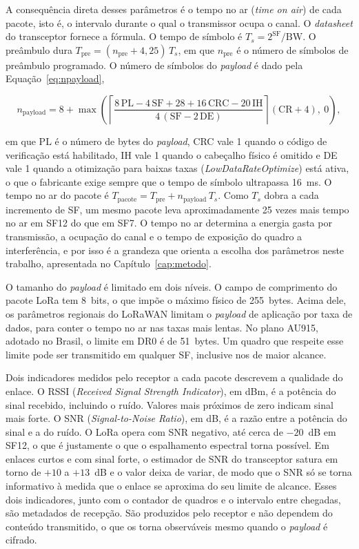 A consequência direta desses parâmetros é o tempo no ar (\textit{time on air}) de cada pacote, isto é, o intervalo durante o qual o transmissor ocupa o canal. O \textit{datasheet} do transceptor \cite{semtech2015sx1276} fornece a fórmula. O tempo de símbolo é $T_s = 2^{\mathrm{SF}}/\mathrm{BW}$. O preâmbulo dura $T_{\mathrm{pre}} = (n_{\mathrm{pre}} + 4{,}25)\,T_s$, em que $n_{\mathrm{pre}}$ é o número de símbolos de preâmbulo programado. O número de símbolos do \textit{payload} é dado pela Equação~\ref{eq:npayload},

\begin{equation}
\label{eq:npayload}
n_{\mathrm{payload}} = 8 + \max\!\left( \left\lceil \frac{8\,\mathrm{PL} - 4\,\mathrm{SF} + 28 + 16\,\mathrm{CRC} - 20\,\mathrm{IH}}{4\,(\mathrm{SF} - 2\,\mathrm{DE})} \right\rceil (\mathrm{CR} + 4),\ 0 \right),
\end{equation}

\noindent em que PL é o número de bytes do \textit{payload}, CRC vale 1 quando o código de verificação está habilitado, IH vale 1 quando o cabeçalho físico é omitido e DE vale 1 quando a otimização para baixas taxas (\textit{LowDataRateOptimize}) está ativa, o que o fabricante exige sempre que o tempo de símbolo ultrapassa 16~ms. O tempo no ar do pacote é $T_{\mathrm{pacote}} = T_{\mathrm{pre}} + n_{\mathrm{payload}}\,T_s$. Como $T_s$ dobra a cada incremento de SF, um mesmo pacote leva aproximadamente 25 vezes mais tempo no ar em SF12 do que em SF7. O tempo no ar determina a energia gasta por transmissão, a ocupação do canal e o tempo de exposição do quadro a interferência, e por isso é a grandeza que orienta a escolha dos parâmetros neste trabalho, apresentada no Capítulo~\ref{cap:metodo}.

O tamanho do \textit{payload} é limitado em dois níveis. O campo de comprimento do pacote LoRa tem 8~bits, o que impõe o máximo físico de 255~bytes. Acima dele, os parâmetros regionais do LoRaWAN \cite{lorawan_rp002} limitam o \textit{payload} de aplicação por taxa de dados, para conter o tempo no ar nas taxas mais lentas. No plano AU915, adotado no Brasil, o limite em DR0 é de 51~bytes. Um quadro que respeite esse limite pode ser transmitido em qualquer SF, inclusive nos de maior alcance.

Dois indicadores medidos pelo receptor a cada pacote descrevem a qualidade do enlace. O RSSI (\textit{Received Signal Strength Indicator}), em dBm, é a potência do sinal recebido, incluindo o ruído. Valores mais próximos de zero indicam sinal mais forte. O SNR (\textit{Signal-to-Noise Ratio}), em dB, é a razão entre a potência do sinal e a do ruído. O LoRa opera com SNR negativo, até cerca de $-20$~dB em SF12, o que é justamente o que o espalhamento espectral torna possível. Em enlaces curtos e com sinal forte, o estimador de SNR do transceptor satura em torno de $+10$ a $+13$~dB e o valor deixa de variar, de modo que o SNR só se torna informativo à medida que o enlace se aproxima do seu limite de alcance. Esses dois indicadores, junto com o contador de quadros e o intervalo entre chegadas, são metadados de recepção. São produzidos pelo receptor e não dependem do conteúdo transmitido, o que os torna observáveis mesmo quando o \textit{payload} é cifrado.

